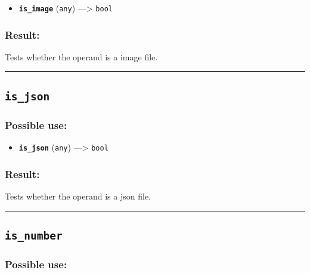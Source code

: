 \documentclass[]{book}
\providecommand{\tightlist}{%
  \setlength{\itemsep}{0pt}\setlength{\parskip}{0pt}}
\theoremstyle{definition}
\theoremstyle{definition}
\theoremstyle{definition}
\theoremstyle{remark}
\begin{document}
\begin{itemize}
\tightlist
\item
  \textbf{\texttt{is\_image}} (\texttt{any}) ---\textgreater{}
  \texttt{bool}
\end{itemize}

\subsubsection{Result:}\label{result-284}

Tests whether the operand is a image file.

\begin{center}\rule{0.5\linewidth}{\linethickness}\end{center}

\subsection{\texorpdfstring{\texttt{is\_json}}{is\_json}}\label{is_json}

\subsubsection{Possible use:}\label{possible-use-295}

\begin{itemize}
\tightlist
\item
  \textbf{\texttt{is\_json}} (\texttt{any}) ---\textgreater{}
  \texttt{bool}
\end{itemize}

\subsubsection{Result:}\label{result-285}

Tests whether the operand is a json file.

\begin{center}\rule{0.5\linewidth}{\linethickness}\end{center}

\subsection{\texorpdfstring{\texttt{is\_number}}{is\_number}}\label{is_number}

\subsubsection{Possible use:}\label{possible-use-296}
\end{document}
